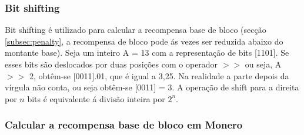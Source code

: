 \subsubsection*{Bit shifting}

Bit shifting é utilizado para calcular a recompensa base de bloco (secção \ref{subsec:penalty}, a recompensa de bloco pode ás vezes ser reduzida abaixo do montante base). Seja um inteiro A = 13 com a representação de bits [1101]. Se esses bits são deslocados por duas posições com o operador $>>$ ou seja, A $>>$ 2, obtêm-se [0011].01, que é igual a 3,25. Na realidade a parte depois da vírgula não conta, ou seja obtêm-se [0011] = 3. A operação de shift para a direita por $n$ bits é equivalente á divisão inteira por $2^n$.  
\subsubsection*{Calcular a recompensa base de bloco em Monero}

